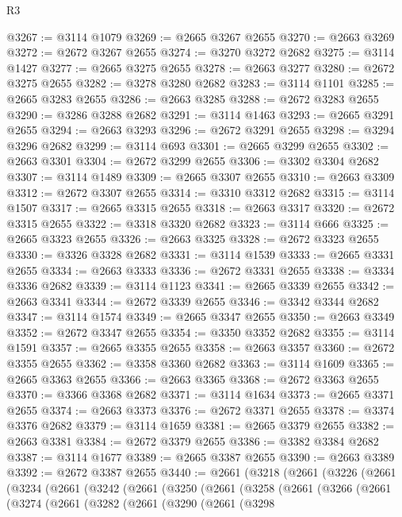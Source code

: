 \begin{lexlean}{R3}
\begin{coremodule}
@3267 := @3114 @1079
@3269 := @2665 @3267 @2655
@3270 := @2663 @3269
@3272 := @2672 @3267 @2655
@3274 := @3270 @3272 @2682
@3275 := @3114 @1427
@3277 := @2665 @3275 @2655
@3278 := @2663 @3277
@3280 := @2672 @3275 @2655
@3282 := @3278 @3280 @2682
@3283 := @3114 @1101
@3285 := @2665 @3283 @2655
@3286 := @2663 @3285
@3288 := @2672 @3283 @2655
@3290 := @3286 @3288 @2682
@3291 := @3114 @1463
@3293 := @2665 @3291 @2655
@3294 := @2663 @3293
@3296 := @2672 @3291 @2655
@3298 := @3294 @3296 @2682
@3299 := @3114 @693
@3301 := @2665 @3299 @2655
@3302 := @2663 @3301
@3304 := @2672 @3299 @2655
@3306 := @3302 @3304 @2682
@3307 := @3114 @1489
@3309 := @2665 @3307 @2655
@3310 := @2663 @3309
@3312 := @2672 @3307 @2655
@3314 := @3310 @3312 @2682
@3315 := @3114 @1507
@3317 := @2665 @3315 @2655
@3318 := @2663 @3317
@3320 := @2672 @3315 @2655
@3322 := @3318 @3320 @2682
@3323 := @3114 @666
@3325 := @2665 @3323 @2655
@3326 := @2663 @3325
@3328 := @2672 @3323 @2655
@3330 := @3326 @3328 @2682
@3331 := @3114 @1539
@3333 := @2665 @3331 @2655
@3334 := @2663 @3333
@3336 := @2672 @3331 @2655
@3338 := @3334 @3336 @2682
@3339 := @3114 @1123
@3341 := @2665 @3339 @2655
@3342 := @2663 @3341
@3344 := @2672 @3339 @2655
@3346 := @3342 @3344 @2682
@3347 := @3114 @1574
@3349 := @2665 @3347 @2655
@3350 := @2663 @3349
@3352 := @2672 @3347 @2655
@3354 := @3350 @3352 @2682
@3355 := @3114 @1591
@3357 := @2665 @3355 @2655
@3358 := @2663 @3357
@3360 := @2672 @3355 @2655
@3362 := @3358 @3360 @2682
@3363 := @3114 @1609
@3365 := @2665 @3363 @2655
@3366 := @2663 @3365
@3368 := @2672 @3363 @2655
@3370 := @3366 @3368 @2682
@3371 := @3114 @1634
@3373 := @2665 @3371 @2655
@3374 := @2663 @3373
@3376 := @2672 @3371 @2655
@3378 := @3374 @3376 @2682
@3379 := @3114 @1659
@3381 := @2665 @3379 @2655
@3382 := @2663 @3381
@3384 := @2672 @3379 @2655
@3386 := @3382 @3384 @2682
@3387 := @3114 @1677
@3389 := @2665 @3387 @2655
@3390 := @2663 @3389
@3392 := @2672 @3387 @2655
@3440 := @2661
    (@3218
      (@2661
        (@3226
          (@2661
            (@3234
              (@2661
                (@3242
                  (@2661
                    (@3250
                      (@2661
                        (@3258
                          (@2661
                            (@3266
                              (@2661
                                (@3274
                                  (@2661
                                    (@3282
                                      (@2661
                                        (@3290
                                          (@2661
                                            (@3298

\end{coremodule}
\end{lexlean}
